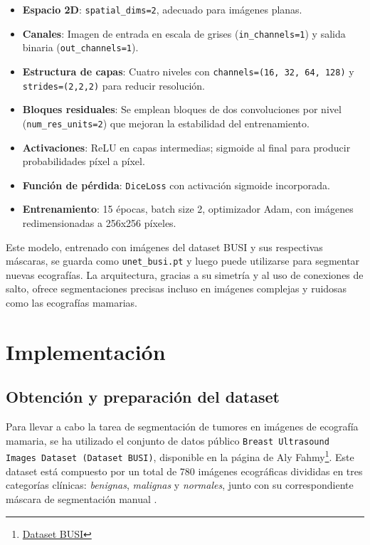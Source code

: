 \documentclass[12pt]{article}
\begin{document}
\begin{itemize}
  \item \textbf{Espacio 2D}: \texttt{spatial\_dims=2}, adecuado para imágenes planas.
  \item \textbf{Canales}: Imagen de entrada en escala de grises (\texttt{in\_channels=1}) y salida binaria (\texttt{out\_channels=1}).
  \item \textbf{Estructura de capas}: Cuatro niveles con \texttt{channels=(16, 32, 64, 128)} y \texttt{strides=(2,2,2)} para reducir resolución.
  \item \textbf{Bloques residuales}: Se emplean bloques de dos convoluciones por nivel (\texttt{num\_res\_units=2}) que mejoran la estabilidad del entrenamiento.
  \item \textbf{Activaciones}: ReLU en capas intermedias; sigmoide al final para producir probabilidades píxel a píxel.
  \item \textbf{Función de pérdida}: \texttt{DiceLoss} con activación sigmoide incorporada.
  \item \textbf{Entrenamiento}: 15 épocas, batch size 2, optimizador Adam, con imágenes redimensionadas a 256x256 píxeles.
\end{itemize}

Este modelo, entrenado con imágenes del dataset BUSI y sus respectivas máscaras, se guarda como \texttt{unet\_busi.pt} y luego puede utilizarse para segmentar nuevas ecografías. La arquitectura, gracias a su simetría y al uso de conexiones de salto, ofrece segmentaciones precisas incluso en imágenes complejas y ruidosas como las ecografías mamarias.

\section{Implementación}
\subsection{Obtención y preparación del dataset}

Para llevar a cabo la tarea de segmentación de tumores en imágenes de ecografía mamaria, se ha utilizado el conjunto de datos público \texttt{Breast Ultrasound Images Dataset (Dataset BUSI)}, disponible en la página de Aly Fahmy\footnote{\href{https://scholar.cu.edu.eg/?q=afahmy/pages/dataset}{Dataset BUSI}}. Este dataset está compuesto por un total de 780 imágenes ecográficas divididas en tres categorías clínicas: \textit{benignas}, \textit{malignas} y \textit{normales}, junto con su correspondiente máscara de segmentación manual \cite{al2020dataset}.
\end{document}
